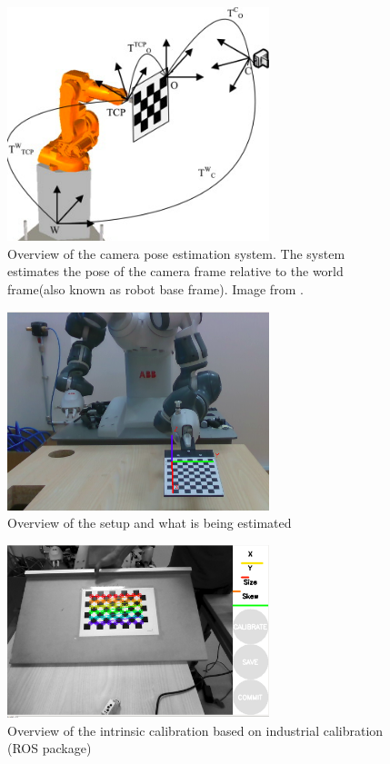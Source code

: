 \begin{figure}[!h]
\begin{center}
\includegraphics[width=3in]{figures03/system1.png}
\caption{Overview of the camera pose estimation system. The system estimates  the pose of the camera frame relative to the world frame(also known as robot base frame). Image from \cite{autCAL}.}
\label{fig:system0}
\end{center}
\end{figure}





\begin{figure}[!h]
\begin{center}
\includegraphics[width=3in]{figures03/robotcamera1.png}
\caption{Overview of the setup and what is being estimated}%
\label{fig:pipeline}
\end{center}
\end{figure}









\begin{figure}[!h]
\begin{center}
\includegraphics[width=3in]{figures03/intros.png}
\caption{Overview of the intrinsic calibration based on industrial calibration (ROS package)}%
\label{fig:pipeline}
\end{center}
\end{figure}


